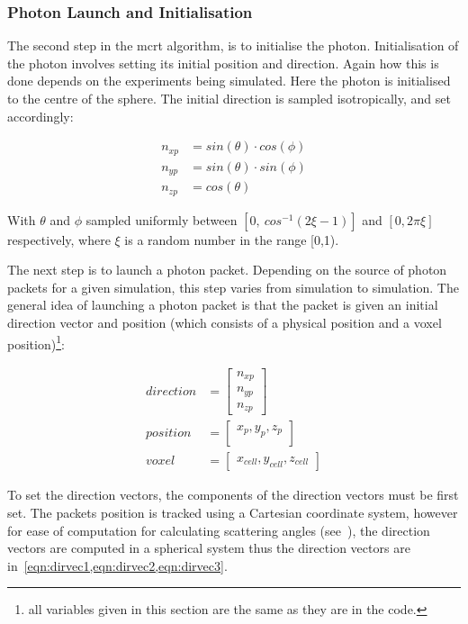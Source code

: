 \subsubsection*{Photon Launch and Initialisation}\label{sec:photlaunch}

The second step in the \gls*{mcrt} algorithm, is to initialise the photon. Initialisation of the photon involves setting its initial position and direction. Again how this is done depends on the experiments being simulated. Here the photon is initialised to the centre of the sphere. The initial direction is sampled isotropically, and set accordingly:

\begin{align}
n_{xp}&=sin(\theta) \cdot cos(\phi) \label{eqn:dirvec1}\\
n_{yp}&=sin(\theta) \cdot sin(\phi) \label{eqn:dirvec2}\\
n_{zp}&=cos(\theta) \label{eqn:dirvec3}
\end{align}


With $\theta$ and $\phi$ sampled uniformly between $[0,\ cos^{-1}(2\xi-1)]$ and $[0,2\pi\xi]$ respectively, where $\xi$ is a random number in the range [0,1).

The next step is to launch a photon packet. 
Depending on the source of photon packets for a given simulation, this step varies from simulation to simulation. 
The general idea of launching a photon packet is that the packet is given an initial direction vector and position (which consists of a physical position and a voxel position)\footnote{all variables given in this section are the same as they are in the code.}:

\begin{align}
	direction &= \begin{bmatrix}
		n_{xp}\\
		n_{yp}\\
		n_{zp}
	\end{bmatrix}\\
	position &= \begin{bmatrix}
		x_p, y_p, z_p\\
	\end{bmatrix}\\
	voxel &= \begin{bmatrix}
		x_{cell}, y_{cell}, z_{cell}
	\end{bmatrix}	 
\end{align}

To set the direction vectors, the components of the direction vectors must be first set. The packets position is tracked using a Cartesian coordinate system, however for ease of computation for calculating scattering angles (see~), the direction vectors are computed in a spherical system thus the direction vectors are in~\cref{eqn:dirvec1,eqn:dirvec2,eqn:dirvec3}. 

